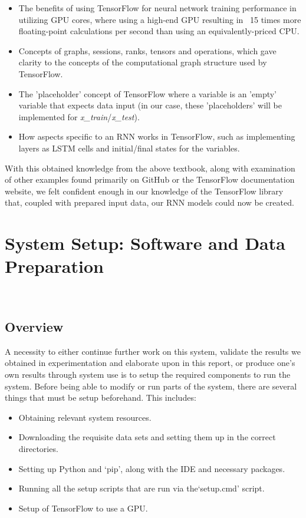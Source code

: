 \documentclass[12pt,twoside]{report}
\begin{document}
\begin{itemize}
	\item The benefits of using TensorFlow for neural network training performance in utilizing GPU cores, where using a high-end GPU resulting in ~15 times more floating-point calculations per second than using an equivalently-priced CPU.
	\item Concepts of graphs, sessions, ranks, tensors and operations, which gave clarity to the concepts of the computational graph structure used by TensorFlow.
	\item The 'placeholder' concept of  TensorFlow where a variable is an 'empty' variable that expects data input (in our case, these 'placeholders' will be implemented for \textit{x\_train}/\textit{x\_test}).
	\item How aspects specific to an RNN works in TensorFlow, such as implementing layers as LSTM cells and initial/final states for the variables.
\end{itemize}

\quad With this obtained knowledge from the above textbook, along with examination of other examples found primarily on GitHub or the TensorFlow documentation website, we felt confident enough in our knowledge of the TensorFlow library that, coupled with prepared input data, our RNN models could now be created.




\chapter{System Setup: Software and Data Preparation\\~\\}

\section{Overview}

\quad A necessity to either continue further work on this system, validate the results we obtained in experimentation and elaborate upon in this report, or produce one’s own results through system use is to setup the required components to run the system. Before being able to modify or run parts of the system, there are several things that must be setup beforehand. This includes:

\begin{itemize}
	\item Obtaining relevant system resources.
	\item Downloading the requisite data sets and setting them up in the correct directories.
	\item Setting up Python and ‘pip’, along with the IDE and necessary packages.
	\item Running all the setup scripts that are run via the‘setup.cmd’ script.
	\item Setup of TensorFlow to use a GPU.
\end{itemize}
\end{document}
